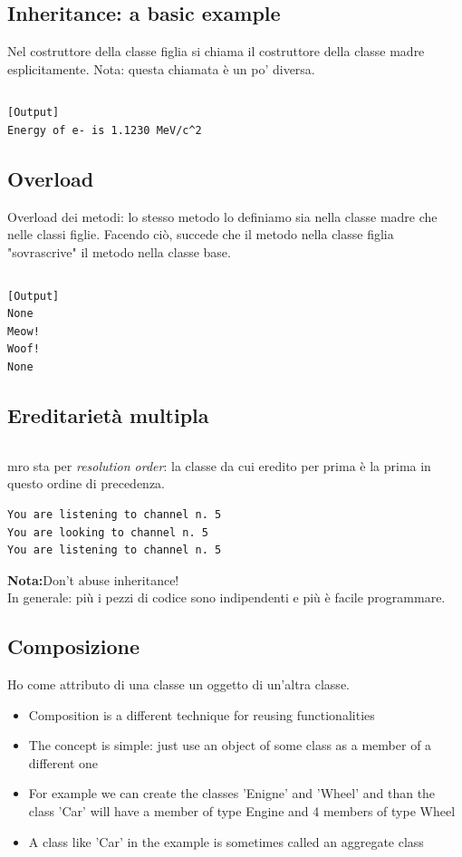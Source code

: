\subsection{Inheritance: a basic example}
Nel costruttore della classe figlia si chiama il costruttore della classe madre esplicitamente. Nota: questa chiamata è un po' diversa.\\
\inputminted{python}{snippets/inheritance.py}

\begin{verbatim}
[Output]
Energy of e- is 1.1230 MeV/c^2
\end{verbatim}


\subsection{Overload}
Overload dei metodi: lo stesso metodo lo definiamo sia nella classe madre che nelle classi figlie. Facendo ciò, succede che il metodo nella classe figlia "sovrascrive" il metodo nella classe base.

\inputminted{python}{snippets/overload.py}

\begin{verbatim}
[Output]
None
Meow!
Woof!
None
\end{verbatim}


\subsection{Ereditarietà multipla}

\inputminted{python}{snippets/multiple_inheritance.py}
mro sta per \textit{resolution order}: la classe da cui eredito per prima è la prima in questo ordine di precedenza.

\begin{verbatim}
You are listening to channel n. 5
You are looking to channel n. 5
You are listening to channel n. 5
\end{verbatim}

\textbf{Nota:}Don’t abuse inheritance!\\
In generale: più i pezzi di codice sono indipendenti  e più è facile programmare.

\subsection{Composizione}
Ho come attributo di una classe un oggetto di un'altra classe.\\

  \begin{itemize}
    \item \alert{Composition} is a different technique for reusing functionalities
    \item The concept is simple: just use an object of some class as a member of
          a different one
    \item For example we can create the classes 'Enigne' and 'Wheel' and than 
          the class 'Car' will have a member of type Engine and 4 members of
          type Wheel
    \item A class like 'Car' in the example is sometimes called an 
          \alert{aggregate} class
  \end{itemize}

